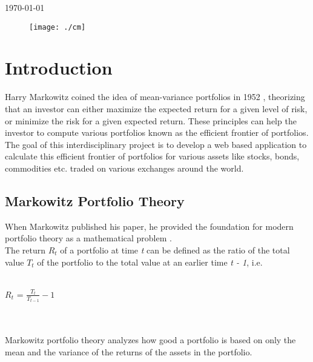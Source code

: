 \begin{titlepage}

{\large \today}\\[2cm] %

\vspace{15mm}
\begin{figure}[h]
\centering
\texttt{[image: ./cm]}
\end{figure}

 

\vfill %

\end{titlepage}

\newpage
\tableofcontents
\newpage


\section{Introduction}

Harry Markowitz coined the idea of mean-variance portfolios in 1952 \cite{mar:har}, theorizing that an investor can either maximize the expected return for a given level of risk, or minimize the risk for a given expected return. These principles can help the investor to compute various portfolios known as the efficient frontier of portfolios.\\
The goal of this interdisciplinary project is to develop a web based application to calculate this efficient frontier of portfolios for various assets like stocks, bonds, commodities etc. traded on various exchanges around the world.

\subsection{Markowitz Portfolio Theory}

When Markowitz published his paper, he provided the foundation for modern portfolio theory as a mathematical problem \cite {wit:dob}.\\
The return $R_t$ of a portfolio at time \textit{t} can be defined as the ratio of the total value $T_t$ of the portfolio to the total value at an earlier time \textit{t - 1}, i.e.\\\\
\centerline{$R_t$ = $\frac{T_t}{T_{t-1}} - 1$}\\\\
Markowitz portfolio theory analyzes how good a portfolio is based on only the mean and the variance of the returns of the assets in the portfolio.\\
